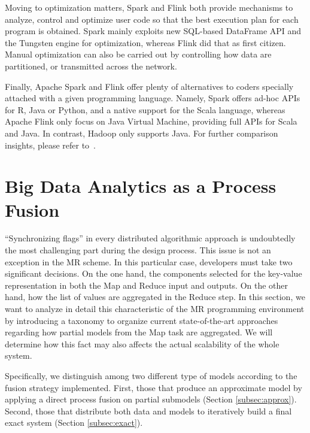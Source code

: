 \documentclass[3p,review]{elsarticle}
\begin{document}
	Moving to optimization matters, Spark and Flink both provide mechanisms to analyze, control and optimize user code so that the best execution plan for each program is obtained. Spark mainly exploits new SQL-based DataFrame API and the Tungsten engine for optimization, whereas Flink did that as first citizen. Manual optimization can also be carried out by controlling how data are partitioned, or transmitted across the network. %
	
	Finally, Apache Spark and Flink offer plenty of alternatives to coders specially attached with a given programming language. Namely, Spark offers ad-hoc APIs for R, Java or Python, and a native support for the Scala language, whereas Apache Flink only focus on Java Virtual Machine, providing full APIs for Scala and Java. In contrast, Hadoop only supports Java. For further comparison insights, please refer to~\cite{Garcia-Gil2017}.%
	
	\section{Big Data Analytics as a Process Fusion}\label{sec:fusion}
	
	``Synchronizing flags'' in every distributed algorithmic approach is undoubtedly the most challenging part during the design process. This issue is not an exception in the MR scheme. In this particular case, developers must take two significant decisions. On the one hand, the components selected for the key-value representation in both the Map and Reduce input and outputs. On the other hand, how the list of values are aggregated in the Reduce step. In this section, we want to analyze in detail this characteristic of the MR programming environment by introducing a taxonomy to organize current state-of-the-art approaches regarding how partial models from the Map task are aggregated. We will determine how this fact may also affects the actual scalability of the whole system. 
	
	Specifically, we distinguish among two different type of models according to the fusion strategy implemented. First, those that produce an approximate model by applying a direct process fusion  on partial submodels (Section \ref{subsec:approx}). Second, those that distribute both data and models to iteratively build a final exact system (Section \ref{subsec:exact}).
	
\end{document}

